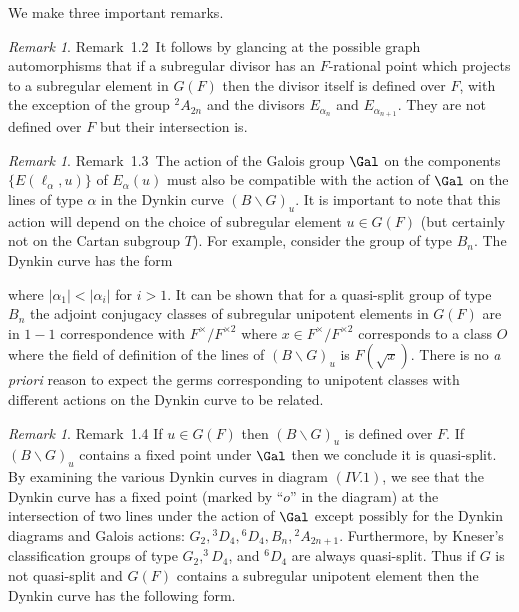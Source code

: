\documentclass{memo-l}
\theoremstyle{definition}
\theoremstyle{remark}
\newtheorem{remark}[theorem]{Remark}
\numberwithin{section}{chapter}
\numberwithin{equation}{chapter}
\begin{document}
{\medskip}


   We make three important remarks.

\begin{remark}{Remark\ 1.2}\ It follows by glancing at the possible graph
automorphisms that if a subregular divisor has an $F$-rational point which
projects to a subregular element in $G(F)$ then the divisor itself is
defined over $F$, with the exception of the group $^{2}A_{2n}$ and the
divisors $E_{{\alpha_n}}$ and $E_{{\alpha_{n+1}}}.$ They are not defined
over $F$ but their intersection is.
\end{remark}

\medpagebreak

\begin{remark}{Remark\ 1.3}\ The action of the Galois group $\Gal$
on the components $\{E({\ell}_{{\alpha}},u)\}$ of $E_{{\alpha}}(u)$ must
also be compatible with the action of $\Gal$ on the lines of type
${\alpha}$ in the Dynkin curve $(B\backslash G)_{u}$.  It is important to
note that this action will depend on the choice of subregular element $u
 \in  G(F)$ (but certainly not on the Cartan subgroup $T$).  For example,
consider the group of type $B_{n}$.  The Dynkin curve has the form

\medskip
\medskip

\noindent
where $\vert {\alpha}_{1}\vert < \vert {\alpha}_{i}\vert$ for $i > 1$.  It
can be shown that for a quasi-split group of type $B_{n}$ the adjoint
conjugacy classes of subregular unipotent elements in $G(F)$ are in $1-1$
correspondence with $F^{\times}/F^{\times 2}$ where $x  \in  F^{\times
}/F^{\times 2}$
corresponds to a class $O$ where the field of definition of the lines of
$(B\backslash G)_{u}$ is $F(\sqrt{x})$.  There is no {\it a priori} reason to expect
the germs corresponding to unipotent classes with different actions on the
Dynkin curve to be related.
\end{remark}

\medpagebreak

\begin{remark}{Remark\ 1.4} If $u  \in  G(F)$ then $(B\backslash G)_{u}$ is
defined over $F$.  If $(B\backslash G)_{u}$ contains a fixed point under
$\Gal$ then we conclude it is quasi-split.  By examining the
various Dynkin curves in diagram $(IV.1)$, we see that the Dynkin curve has
a fixed point (marked by ``$o$'' in the diagram) at the intersection of two
lines under the action of $\Gal$ except possibly for the Dynkin
diagrams and Galois actions: $G_{2}, {}^{3}D_{4}, {}^{6}D_{4}, B_{n},
{}^{2}A_{2n+1}$.  Furthermore, by Kneser's classification \cites{MR0188219,MR0174559} groups of
type $G_{2}, ^{3}D_{4}$, and $^{6}D_{4}$ are always quasi-split.  Thus if
$G$ is not quasi-split and $G(F)$ contains a subregular unipotent element
then the Dynkin curve has the following form.
\end{remark}
\end{document}
